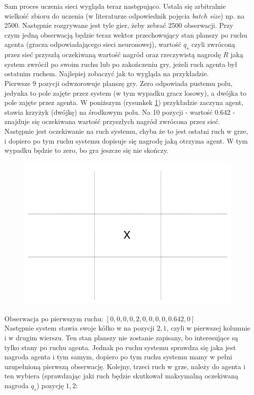 \documentclass[licencjacka]{pracamgr}
\begin{document}
Sam proces uczenia sieci wygląda teraz następująco. Ustala się arbitralnie wielkość zbioru do uczenia (w literaturze odpowiednik pojęcia \textit{batch size}) np. na 2500. Następnie rozgrywane jest tyle gier, żeby zebrać 2500 obserwacji. Przy czym jedną obserwacją będzie teraz wektor przechowujący stan planszy po ruchu agenta (gracza odpowiadającego sieci neuronowej), wartość $q_{s}$ czyli zwróconą przez sieć przyszłą oczekiwaną wartość nagród  oraz rzeczywistą nagrodę $R$  jaką system zwrócił po swoim ruchu lub po zakończeniu gry, jeżeli ruch agenta był ostatnim ruchem. Najlepiej zobaczyć jak to wygląda na przykładzie.\\

Pierwsze 9 pozycji odwzorowuje planszę gry. Zero odpowiada pustemu polu, jedynka to pole zajęte przez system (w tym wypadku gracz losowy), a dwójka to pole zajęte przez agenta.
W poniższym (rysunkek \ref{Rys27}) przykładzie zaczyna agent, stawia krzyżyk (dwójkę) na środkowym polu. Na 10 pozycji  - wartość 0.642  - znajduje się oczekiwana wartość przyszłych nagród zwrócona przez sieć. Następnie jest oczekiwanie na ruch systemu, chyba że to jest ostatni ruch w grze, i dopiero po tym ruchu systemu dopisuje się nagrodę jaką otrzyma agent. W tym wypadku będzie to zero, bo gra jeszcze się nie skończy.

 
\begin{figure}[h!]
	\includegraphics [scale=0.2] {ttt_6.png}
	\caption{}
	\label{Rys27}
\end{figure}
$\text{Obserwacja po pierwszym ruchu:  }[0, 0, 0, 0, 2, 0, 0, 0, 0, 0.642, 0]$\\

 Następnie system stawia swoje kółko w na pozycji $2,1$, czyli w pierwszej kolumnie i w drugim wierszu. Ten stan planszy nie zostanie zapisany, bo interesujące są tylko stany po ruchu agenta. Jednak po ruchu systemu sprawdza się jaka jest nagroda agenta i tym samym, dopiero po tym ruchu systemu mamy w pełni uzupełnioną pierwszą obserwację. Kolejny, trzeci ruch w grze, należy do agenta i ten wybiera (sprawdzając jaki ruch będzie skutkował maksymalną oczekiwaną nagroda $q_{s}$) pozycję $1,2$:
 
\end{document}
